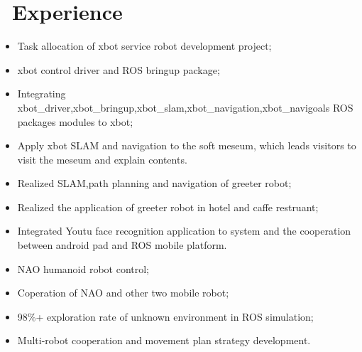 \documentclass{resume}
\begin{document}
\section{\faUsers\ Experience}

\begin{itemize}
  \item Task allocation of xbot service robot development project;
  \item xbot control driver and ROS bringup package;
  \item Integrating xbot\_driver,xbot\_bringup,xbot\_slam,xbot\_navigation,xbot\_navigoals ROS packages modules to xbot;
  \item Apply xbot SLAM and navigation to the soft meseum, which leads visitors to visit the meseum and explain contents.
\end{itemize}


\begin{itemize}
  \item Realized SLAM,path planning and navigation of greeter robot;
  \item Realized the application of greeter robot in hotel and caffe restruant;
  \item Integrated Youtu face recognition application to system and the cooperation between android pad and ROS mobile platform.  
\end{itemize}



\begin{itemize}
  \item NAO humanoid robot control;
  \item Coperation of NAO and other two mobile robot;
  \item 98\%+ exploration rate of unknown environment in ROS simulation;
  \item Multi-robot cooperation and movement plan strategy development.
\end{itemize}


\end{document}

